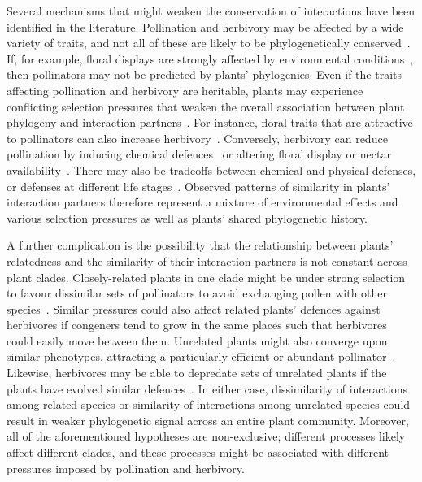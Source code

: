 \documentclass[12pt]{article}
\begin{document}
\begin{spacing}{1.5}
  Several mechanisms that might weaken the conservation of interactions
  have been identified in the literature. Pollination and herbivory may be affected
  by a wide variety of traits, and not all of these are likely to be
  phylogenetically conserved~\citep{Rezende2007,Kursar2009,Ibanez2016}. If, for example,
  floral displays are strongly affected by environmental conditions~\citep{Canto2004}, 
  then pollinators may not be predicted by plants' phylogenies.
  Even if the traits affecting pollination and herbivory are
  heritable, plants may experience conflicting selection pressures that
  weaken the overall association between plant phylogeny and interaction
  partners~\citep{Armbruster1997,Lankau2007,Siepielski2010,Wise2013,Karinho2014}. 
  For instance, floral traits that
  are attractive to pollinators can also increase 
  herbivory~\citep{Strauss2002,Adler2004,Theis2006}. 
  Conversely, herbivory can reduce pollination by inducing chemical 
  defences~\citep{Adler2006} or altering floral display or nectar 
  availability~\citep{Strauss1997}. There may also be tradeoffs between chemical and physical defenses, or defenses at different life stages~\citep{Karinho2014,Endara2017}. Observed patterns
  of similarity in plants' interaction partners therefore represent
  a mixture of environmental effects and various selection pressures as
  well as plants' shared phylogenetic history.


  A further complication is the possibility that the relationship between
  plants' relatedness and the similarity of their interaction partners is
  not constant across plant clades. Closely-related plants
  in one clade might be under strong selection to favour dissimilar
  sets of pollinators to avoid exchanging pollen with other
  species~\citep{Levin1970,Bell2005,Mitchell2009}. Similar pressures 
  could also affect related plants' defences against herbivores if 
  congeners tend to grow in the same places such that herbivores 
  could easily move between them.  Unrelated plants might also 
  converge upon similar phenotypes, attracting a particularly 
  efficient or abundant pollinator~\citep{Ollerton1996,Ollerton2009,Ibanez2016}. 
  Likewise, herbivores may be able to depredate sets of unrelated 
  plants if the plants have evolved similar defences~\citep{Pichersky2000}. 
  In either case, dissimilarity of interactions among related species 
  or similarity of interactions among unrelated species could result 
  in weaker phylogenetic signal across an entire plant community. 
  Moreover, all of the aforementioned hypotheses 
  are non-exclusive; different processes likely affect different
  clades, and these processes might be associated with different 
  pressures imposed by pollination and herbivory. 



\end{spacing}
\end{document}
